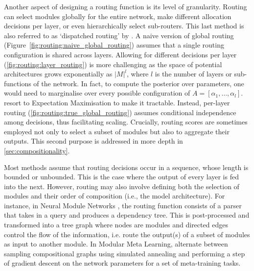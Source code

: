 \documentclass[10pt]{article} %
\begin{document}
Another aspect of designing a routing function is its level of granularity. Routing can select modules globally for the entire network, make different allocation decisions per layer, or even hierarchically select sub-routers. This last method is also referred to as `dispatched routing' by \citet{rosenbaum2017routing}. A naive version of global routing (Figure~\ref{fig:routing:naive_global_routing}) assumes that a single routing configuration is shared across layers. Allowing for different decisions per layer (\cref{fig:routing:layer_routing}) is more challenging as the space of potential architectures grows exponentially as $|M|^l$, where $l$ is the number of layers or sub-functions of the network. In fact, to compute the posterior over parameters, one would need to marginalise over every possible configuration of $A = [\alpha_1, \dots, \alpha_l]$. \citet{kirsch2018modular} resort to Expectation Maximisation to make it tractable. Instead, per-layer routing (\cref{fig:routing:true_global_routing}) assumes conditional independence among decisions, thus facilitating scaling.
Crucially, routing scores are sometimes employed not only to select a subset of modules but also to aggregate their outputs. This second purpose is addressed in more depth in \cref{sec:compositionality}.

Most methods assume that routing decisions occur in a sequence, whose length is bounded or unbounded. This is the case where the output of every layer is fed into the next. However, routing may also involve defining both the selection of modules and their order of composition (i.e., the model architecture). For instance, in Neural Module Networks \citep[NMNs;][]{andreas2016nmn,andreas2017modular}, the routing function consists of a parser that takes in a query and produces a dependency tree. This is post-processed and transformed into a tree graph where nodes are modules and directed edges control the flow of the information, i.e. route the output(s) of a subset of modules as input to another module. In Modular Meta Learning, \citet{alet2018modular} alternate between sampling compositional graphs using simulated annealing \citep{kirkpatrick1983optimization} and performing a step of gradient descent on the network parameters for a set of meta-training tasks.
\end{document}
